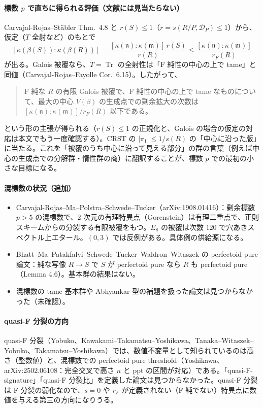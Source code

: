 \documentclass[11pt,a4paper]{ltjsarticle}
\theoremstyle{plain}
\theoremstyle{definition}
\theoremstyle{remark}
\theoremstyle{plain}
\newcommand{\m}{\mathfrak{m}}
\newcommand{\n}{\mathfrak{n}}
\newcommand{\Tr}{\operatorname{Tr}}
\begin{document}
\paragraph{標数 $p$ で直ちに得られる評価（文献には見当たらない）}
Carvajal-Rojas--Stäbler Thm.~4.8 と $r(S)\le1$（$r = s(R/P,\mathscr{D}_P)\le1$）から、仮定（$T$ 全射など）のもとで
\[
  [\kappa(\beta(S)):\kappa(\beta(R))] = \frac{[\kappa(\n):\kappa(\m)]\,r(S)}{r(R)}\le\frac{[\kappa(\n):\kappa(\m)]}{r_F(R)}
\]
が出る。Galois 被覆なら、$T = \Tr$ の全射性は「F 純性の中心の上で tame」と同値（Carvajal-Rojas--Fayolle Cor.~6.15）。したがって、
\begin{quote}
F 純な $R$ の有限 Galois 被覆で、F 純性の中心の上で tame なものについて、最大の中心 $V(\beta)$ の生成点での剰余拡大の次数は $[\kappa(\n):\kappa(\m)]/r_F(R)$ 以下である。
\end{quote}
という形の主張が得られる（$r(S)\le1$ の正規化と、Galois の場合の仮定の対応は本文でもう一度確認する）。CRST の $|\pi_1|\le1/s(R)$ の「中心に沿った版」に当たる。これを「被覆のうち中心に沿って見える部分」の群の言葉（例えば中心の生成点での分解群・惰性群の商）に翻訳することが、標数 $p$ での最初の小さな目標になる。

\paragraph{混標数の状況（追加）}
\begin{itemize}
  \item Carvajal-Rojas--Ma--Polstra--Schwede--Tucker（arXiv:1908.01416）：剰余標数 $p>5$ の混標数で、2 次元の有理特異点（Gorenstein）は有理二重点で、正則スキームからの分裂する有限被覆をもつ。$E_8$ の被覆は次数 $120$ で穴あきスペクトル上エタール。$(0,3)$ では反例がある。具体例の供給源になる。
  \item Bhatt--Ma--Patakfalvi--Schwede--Tucker--Waldron--Witaszek の perfectoid pure 論文：純な写像 $R\to S$ で $S$ が perfectoid pure なら $R$ も perfectoid pure（Lemma 4.6）。基本群の結果はない。
  \item 混標数の tame 基本群や Abhyankar 型の補題を扱った論文は見つからなかった（未確認）。
\end{itemize}

\paragraph{quasi-F 分裂の方向}
quasi-F 分裂（Yobuko、Kawakami--Takamatsu--Yoshikawa、Tanaka--Witaszek--Yobuko、Takamatsu--Yoshikawa）では、数値不変量として知られているのは高さ（整数値）と、混標数での perfectoid pure threshold（Yoshikawa、arXiv:2502.06108：完全交叉で高さ $n$ と ppt の区間が対応）である。「quasi-F-signature」「quasi-F 分裂比」を定義した論文は見つからなかった。quasi-F 分裂は F 分裂の弱化なので、$s = 0$ や $r_F$ が定義されない（F 純でない）特異点に数値を与える第三の方向になりうる。
\end{document}
